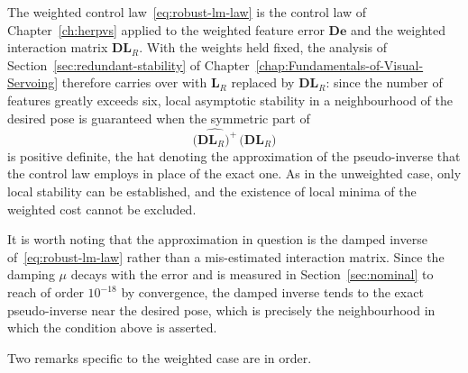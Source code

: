 The weighted control law~\eqref{eq:robust-lm-law} is the control law of
Chapter~\ref{ch:herpvs} applied to the weighted feature error
$\mathbf{D}\mathbf{e}$ and the weighted interaction matrix
$\mathbf{D}\mathbf{L}_{R}$. With the weights held fixed, the analysis of
Section~\ref{sec:redundant-stability} of
Chapter~\ref{chap:Fundamentals-of-Visual-Servoing} therefore carries over with
$\mathbf{L}_{R}$ replaced by $\mathbf{D}\mathbf{L}_{R}$: since the number of
features greatly exceeds six, local asymptotic stability in a neighbourhood of
the desired pose is guaranteed when the symmetric part of
\begin{equation}
    \widehat{\bigl(\mathbf{D}\mathbf{L}_{R}\bigr)^{+}}\,
    \bigl(\mathbf{D}\mathbf{L}_{R}\bigr)
    \label{eq:robust-stability-matrix}
\end{equation}
is positive definite, the hat denoting the approximation of the pseudo-inverse
that the control law employs in place of the exact one. As in the unweighted
case, only local stability can be established, and the existence of local
minima of the weighted cost cannot be excluded.

It is worth noting that the approximation in question is the damped inverse
of~\eqref{eq:robust-lm-law} rather than a mis-estimated interaction matrix.
Since the damping $\mu$ decays with the error and is measured in
Section~\ref{sec:nominal} to reach of order $10^{-18}$ by convergence, the
damped inverse tends to the exact pseudo-inverse near the desired pose, which
is precisely the neighbourhood in which the condition above is asserted.

Two remarks specific to the weighted case are in order.

